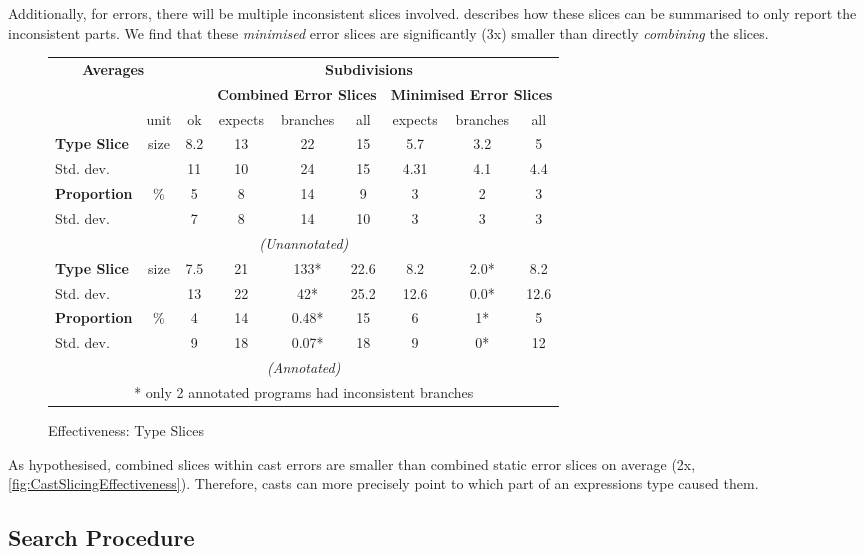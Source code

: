 Additionally, for errors, there will be multiple inconsistent slices involved.  describes how these slices can be summarised to only report the inconsistent parts. We find that these \textit{minimised} error slices are significantly (3x) smaller than directly \textit{combining} the slices.

\begin{figure}[h]
  \centering
  \begin{tabular}{lc|c|ccc|ccc}
  \multicolumn{2}{c}{\textbf{Averages}} & \multicolumn{7}{c}{\textbf{Subdivisions}}\\
  & & & \multicolumn{3}{c|}{\textbf{Combined Error Slices}} & \multicolumn{3}{c}{\textbf{Minimised Error Slices}}\\ 
   & unit & ok & expects & branches & all & expects & branches & all\\
   \hline
   \textbf{Type Slice} & size &  8.2 & 13 & 22 & 15&  5.7 & 3.2 & 5 \\
   Std. dev. &  				 &  11 & 10 & 24 & 15&    4.31 & 4.1 & 4.4 \\
   \textbf{Proportion}& \%    & 5 & 8 & 14 & 9&        3  & 2 & 3 \\
   Std. dev. &  				 &  7 & 8 & 14 & 10&      3 & 3 & 3 \\
   \multicolumn{9}{c}{\textit{(Unannotated)}}\\
   \textbf{Type Slice} & size &  7.5 & 21 & 133* & 22.6 &8.2&  2.0* & 8.2  \\
   Std. dev. 			&    &  13 & 22 & 42* & 25.2& 12.6&  0.0* & 12.6  \\
   \textbf{Proportion}& \% 	 & 4 & 14 & 0.48* & 15&  6&    1* & 5  \\
   Std. dev. &  				 &  9 & 18 & 0.07* & 18&   9&    0* & 12  \\
   \multicolumn{9}{c}{\textit{(Annotated)}}\\
   \multicolumn{9}{c}{* only 2 annotated programs had inconsistent branches}
  \end{tabular}
  \caption{Effectiveness: Type Slices}
\label{fig:TypeSlicingEffectiveness}
\end{figure}
As hypothesised, combined slices within cast errors are smaller than combined static error slices on average (2x, \cref{fig:CastSlicingEffectiveness}). Therefore, casts can more precisely point to which part of an expressions type caused them.



\subsection{Search Procedure}

